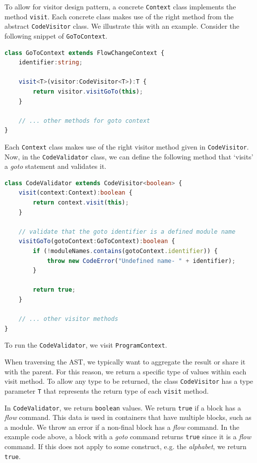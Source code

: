 To allow for visitor design pattern, a concrete \texttt{Context} class implements the method \texttt{visit}. Each concrete class makes use of the right method from the abstract \texttt{CodeVisitor} class. We illustrate this with an example. Consider the following snippet of \texttt{GoToContext}.
\begin{lstlisting}[language=TypeScript]
class GoToContext extends FlowChangeContext {    
    identifier:string;
    
    visit<T>(visitor:CodeVisitor<T>):T {
        return visitor.visitGoTo(this);
    }

    // ... other methods for goto context
}
\end{lstlisting}
    Each \texttt{Context} class makes use of the right visitor method given in \texttt{CodeVisitor}. Now, in the \texttt{CodeValidator} class, we can define the following method that `visits' a \textit{goto} statement and validates it.
\begin{lstlisting}[language=TypeScript]
class CodeValidator extends CodeVisitor<boolean> {
    visit(context:Context):boolean {
        return context.visit(this);
    }
    
    // validate that the goto identifier is a defined module name
    visitGoTo(gotoContext:GoToContext):boolean {
        if (!moduleNames.contains(gotoContext.identifier)) {
            throw new CodeError("Undefined name- " + identifier);
        }

        return true;
    }

    // ... other visitor methods
}
\end{lstlisting}
To run the \texttt{CodeValidator}, we visit \texttt{ProgramContext}.

When traversing the AST, we typically want to aggregate the result or share it with the parent. For this reason, we return a specific type of values within each visit method. To allow any type to be returned, the class \texttt{CodeVisitor} has a type parameter \texttt{T} that represents the return type of each \texttt{visit} method.

In \texttt{CodeValidator}, we return \texttt{boolean} values. We return \texttt{true} if a block has a \textit{flow} command. This data is used in containers that have multiple blocks, such as a module. We throw an error if a non-final block has a \textit{flow} command. In the example code above, a block with a \textit{goto} command returns \texttt{true} since it is a \textit{flow} command. If this does not apply to some construct, e.g. the \textit{alphabet}, we return \texttt{true}.


